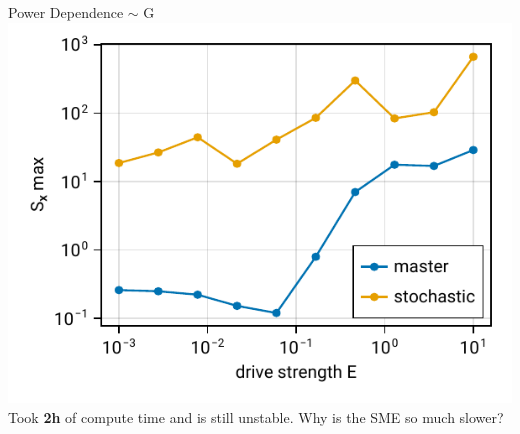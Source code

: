 \documentclass{beamer}
\begin{document}
\begin{frame}{Power Dependence $\sim$ G}
	\includegraphics{figures/02 power.pdf}
	\\\small
	Took \textbf{2h} of compute time and is still unstable. Why is the SME so much slower?
\end{frame}
\end{document}
